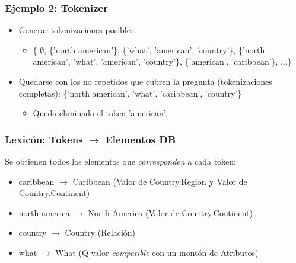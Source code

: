 \begin{frame}[<+->]
\frametitle{Ejemplo 2: Tokenizer}

  \begin{itemize}
  \item Generar tokenizaciones posibles:
    \begin{itemize}
      \item    \{ $\emptyset$, \{'north american'\}, \{'what', 'american', 'country'\}, \{'north american', 'what', 'american', 'country'\}, \{'american', 'caribbean'\}, ...\}
    \end{itemize}
  \item Quedarse con los no repetidos que cubren la pregunta (tokenizaciones completas): \{'north american', 'what', 'caribbean', 'country'\}
    \begin{itemize}
        \item Queda eliminado el token 'american'.
    \end{itemize}
  \end{itemize}

\end{frame}

\begin{frame}[<+->]
\frametitle{Lexicón: Tokens $\rightarrow$ Elementos DB}
Se obtienen todos los elementos que \textit{corresponden} a cada token:
   \small{
  \begin{itemize}

    \item caribbean $\rightarrow$ Caribbean (Valor de Country.Region \textbf{y} Valor de Country.Continent)
    \item north america $\rightarrow$ North America (Valor de Country.Continent)
    \item country $\rightarrow$ Country (Relación)
    \item what $\rightarrow$ What (Q-valor \textit{compatible} con un montón de Atributos)
    
  \end{itemize}
  }
\end{frame}

